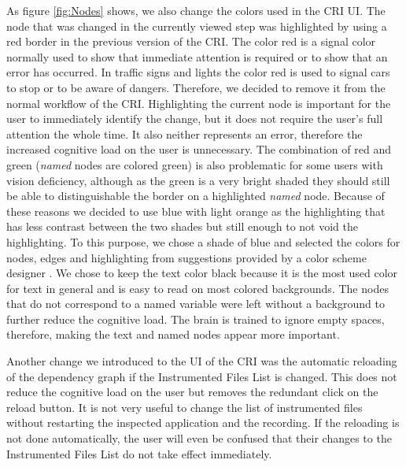 As figure \ref{fig:Nodes} shows, we also change the colors used in the CRI UI. The node that was changed in the currently viewed step was highlighted by using a red border in the previous version of the CRI. The color red is a signal color normally used to show that immediate attention is required or to show that an error has occurred. In traffic signs and lights the color red is used to signal cars to stop or to be aware of dangers. Therefore, we decided to remove it from the normal workflow of the CRI. Highlighting the current node is important for the user to immediately identify the change, but it does not require the user's full attention the whole time. It also neither represents an error, therefore the increased cognitive load on the user is unnecessary. The combination of red and green (\emph{named} nodes are colored green) is also problematic for some users with vision deficiency, although as the green is a very bright shaded they should still be able to distinguishable the border on a highlighted \emph{named} node. Because of these reasons we decided to use blue with light orange as the highlighting that has less contrast between the two shades but still enough to not void the highlighting. To this purpose, we chose a shade of blue and selected the colors for nodes, edges and highlighting from suggestions provided by a color scheme designer \cite{Paletton}. We chose to keep the text color black because it is the most used color for text in general and is easy to read on most colored backgrounds. The nodes that do not correspond to a named variable were left without a background to further reduce the cognitive load. The brain is trained to ignore empty spaces, therefore, making the text and named nodes appear more important.

Another change we introduced to the UI of the CRI was the automatic reloading of the dependency graph if the Instrumented Files List is changed. This does not reduce the cognitive load on the user but removes the redundant click on the reload button. It is not very useful to change the list of instrumented files without restarting the inspected application and the recording. If the reloading is not done automatically, the user will even be confused that their changes to the Instrumented Files List do not take effect immediately.
	
